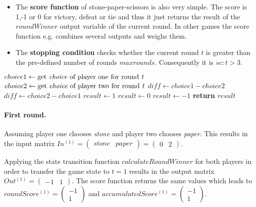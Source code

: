 \begin{itemize}
\item The \textbf{score function} of stone-paper-scissors is also very simple. The score is 1,-1 or 0 for victory, defeat or tie and thus it just returns the result of the $roundWinner$ output variable of the current round. In other games the score function e.g. combines several outputs and weighs them.
\item The \textbf{stopping condition} checks whether the current round $t$ is greater than the pre-defined number of rounds $maxrounds$. Consequently it is $sc: t > 3$.
\end{itemize}
\begin{algorithm}[h]
	\caption{$\mathtt{}$}
	\label{alg:roundWinner}
	\begin{algorithmic}[1]
	    \State $choice1 \gets \text{get \textit{choice} of player one for round \textit{t}} $ 
	    \State $choice2 \gets \text{get \textit{choice} of player two for round \textit{t}} $
	        \State $diff \gets choice1 - choice2$ 
	        \State $diff \gets choice2 - choice1$
	    \EndIf
	        \State $result \gets 1$
	        \State $result \gets 0$
	    \Else
	        \State $result \gets -1$
	    \EndIf
	    \State \textbf{return} $result$
	    \EndFunction
	\end{algorithmic}
\end{algorithm}

\paragraph{First round.} 

Assuming player one chooses \textit{stone} and player two chooses \textit{paper}. This results in the input matrix
$In^{(1)} = \begin{pmatrix}
stone&paper
\end{pmatrix} = \begin{pmatrix}
0&2
\end{pmatrix}$.

Applying the state transition function $calculateRoundWinner$ for both players in order to transfer the game state to $t=1$ results in the output matrix $Out^{(1)}=\begin{pmatrix}
-1&1
\end{pmatrix}$. The score function returns the same values which leads to $roundScore^{(1)}=\begin{pmatrix}
-1\\1
\end{pmatrix}$ and \newline $accumulatedScore^{(1)}=\begin{pmatrix}
-1\\1
\end{pmatrix}$.

